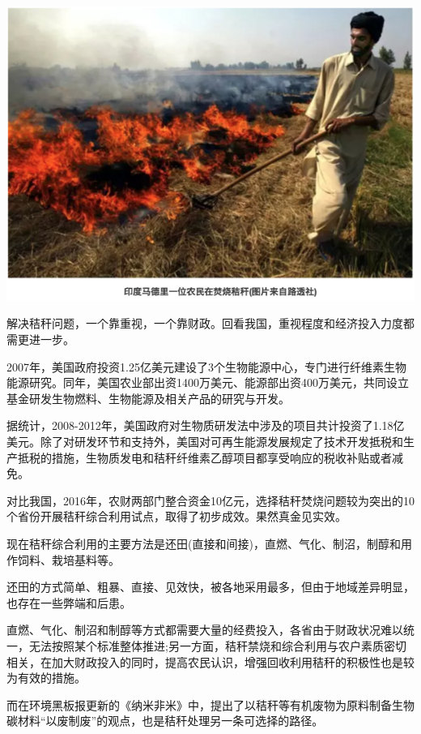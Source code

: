 \documentclass[]{book}
\begin{document}
\includegraphics[width=8.33in]{images/stalk4}

解决秸秆问题，一个靠重视，一个靠财政。回看我国，重视程度和经济投入力度都需更进一步。

2007年，美国政府投资1.25亿美元建设了3个生物能源中心，专门进行纤维素生物能源研究。同年，美国农业部出资1400万美元、能源部出资400万美元，共同设立基金研发生物燃料、生物能源及相关产品的研究与开发。

据统计，2008-2012年，美国政府对生物质研发法中涉及的项目共计投资了1.18亿美元。除了对研发环节和支持外，美国对可再生能源发展规定了技术开发抵税和生产抵税的措施，生物质发电和秸秆纤维素乙醇项目都享受响应的税收补贴或者减免。

对比我国，2016年，农财两部门整合资金10亿元，选择秸秆焚烧问题较为突出的10个省份开展秸秆综合利用试点，取得了初步成效。果然真金见实效。

现在秸秆综合利用的主要方法是还田(直接和间接)，直燃、气化、制沼，制醇和用作饲料、栽培基料等。

还田的方式简单、粗暴、直接、见效快，被各地采用最多，但由于地域差异明显，也存在一些弊端和后患。

直燃、气化、制沼和制醇等方式都需要大量的经费投入，各省由于财政状况难以统一，无法按照某个标准整体推进;另一方面，秸秆禁烧和综合利用与农户素质密切相关，在加大财政投入的同时，提高农民认识，增强回收利用秸秆的积极性也是较为有效的措施。

而在环境黑板报更新的《纳米非米》中，提出了以秸秆等有机废物为原料制备生物碳材料``以废制废''的观点，也是秸秆处理另一条可选择的路径。
\end{document}
